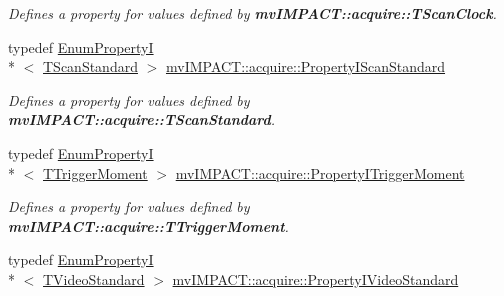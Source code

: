 \begin{DoxyCompactItemize}
\begin{DoxyCompactList}\small\item\em Defines a property for values defined by {\bfseries mv\+I\+M\+P\+A\+C\+T\+::acquire\+::\+T\+Scan\+Clock}. \end{DoxyCompactList}\item 
\hypertarget{group___device_specific_interface_gabc31d508d02db97ff522a1285a450f04}{typedef \hyperlink{classmv_i_m_p_a_c_t_1_1acquire_1_1_enum_property_i}{Enum\+Property\+I}\\*
$<$ \hyperlink{group___device_specific_interface_ga7a78489f39d4e77dd06dd7cee5c40de0}{T\+Scan\+Standard} $>$ \hyperlink{group___device_specific_interface_gabc31d508d02db97ff522a1285a450f04}{mv\+I\+M\+P\+A\+C\+T\+::acquire\+::\+Property\+I\+Scan\+Standard}}\label{group___device_specific_interface_gabc31d508d02db97ff522a1285a450f04}

\begin{DoxyCompactList}\small\item\em Defines a property for values defined by {\bfseries mv\+I\+M\+P\+A\+C\+T\+::acquire\+::\+T\+Scan\+Standard}. \end{DoxyCompactList}\item 
\hypertarget{group___device_specific_interface_gaa261dc5ec8f6c2053d6e5a1485ac101d}{typedef \hyperlink{classmv_i_m_p_a_c_t_1_1acquire_1_1_enum_property_i}{Enum\+Property\+I}\\*
$<$ \hyperlink{group___device_specific_interface_gaecea4d916e389bf03470e46d3c8e1851}{T\+Trigger\+Moment} $>$ \hyperlink{group___device_specific_interface_gaa261dc5ec8f6c2053d6e5a1485ac101d}{mv\+I\+M\+P\+A\+C\+T\+::acquire\+::\+Property\+I\+Trigger\+Moment}}\label{group___device_specific_interface_gaa261dc5ec8f6c2053d6e5a1485ac101d}

\begin{DoxyCompactList}\small\item\em Defines a property for values defined by {\bfseries mv\+I\+M\+P\+A\+C\+T\+::acquire\+::\+T\+Trigger\+Moment}. \end{DoxyCompactList}\item 
\hypertarget{group___device_specific_interface_ga8b964e42762ee1cba12e1b4bd9c9f114}{typedef \hyperlink{classmv_i_m_p_a_c_t_1_1acquire_1_1_enum_property_i}{Enum\+Property\+I}\\*
$<$ \hyperlink{group___common_interface_gafd55ecc3208ea4000a6d2517894a280f}{T\+Video\+Standard} $>$ \hyperlink{group___device_specific_interface_ga8b964e42762ee1cba12e1b4bd9c9f114}{mv\+I\+M\+P\+A\+C\+T\+::acquire\+::\+Property\+I\+Video\+Standard}}\label{group___device_specific_interface_ga8b964e42762ee1cba12e1b4bd9c9f114}


\end{DoxyCompactItemize}
